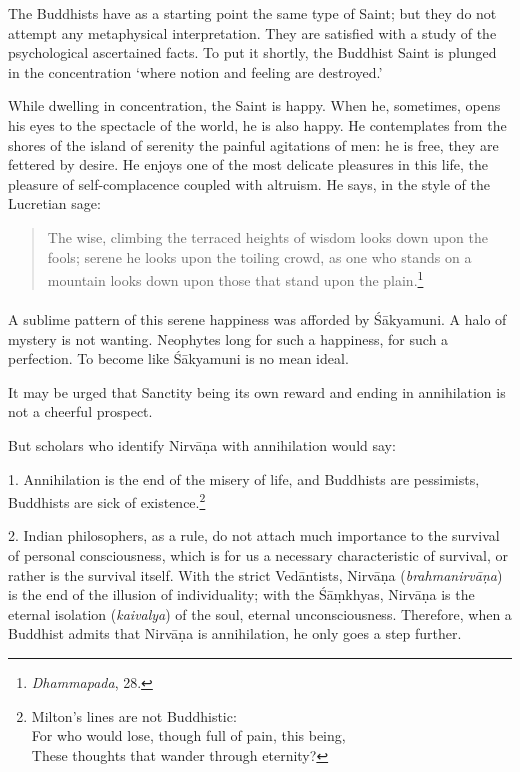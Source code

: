 \documentclass[a4paper, 11pt, oneside, english, landscape]{article}
\begin{document}
The Buddhists have as a starting point the same type of Saint; but they do not attempt any metaphysical interpretation. They are satisfied with a study of the psychological ascertained facts. To put it shortly, the Buddhist Saint is plunged in the concentration `where notion and feeling are destroyed.'

While dwelling in concentration, the Saint is happy. When he, sometimes, opens his eyes to the spectacle of the world, he is also happy. He contemplates from the shores of the island of serenity the painful agitations of men: he is free, they are fettered by desire. He enjoys one of the most delicate pleasures in this life, the pleasure of self-complacence coupled with altruism. He says, in the style of the Lucretian sage:
\begin{quotation}
\small
The wise, climbing the terraced heights of wisdom looks down upon the fools; serene he looks upon the toiling crowd, as one who stands on a mountain looks down upon those that stand upon the plain.\footnote{\emph{Dhammapada}, 28.}
\end{quotation}
\paragraph{}
A sublime pattern of this serene happiness was afforded by Śākyamuni. A halo of mystery is not wanting. Neophytes long for such a happiness, for such a perfection. To become like Śākyamuni is no mean ideal.

It may be urged that Sanctity being its own reward and ending in annihilation is not a cheerful prospect.

But scholars who identify Nirvāṇa with annihilation would say:

1. Annihilation is the end of the misery of life, and Buddhists are pessimists, Buddhists are sick of existence.\footnote{Milton's lines are not Buddhistic:\\\hspace*{10mm}For who would lose, though full of pain, this being,\\\hspace*{10mm}These thoughts that wander through eternity?}

2. Indian philosophers, as a rule, do not attach much importance to the survival of personal consciousness, which is for us a necessary characteristic of survival, or rather is the survival itself. With the strict Vedāntists, Nirvāṇa (\emph{brahmanirvāṇa}) is the end of the illusion of individuality; with the Śāṃkhyas, Nirvāṇa is the eternal isolation (\emph{kaivalya}) of the soul, eternal unconsciousness. Therefore, when a Buddhist admits that Nirvāṇa is annihilation, he only goes a step further.
\end{document}
